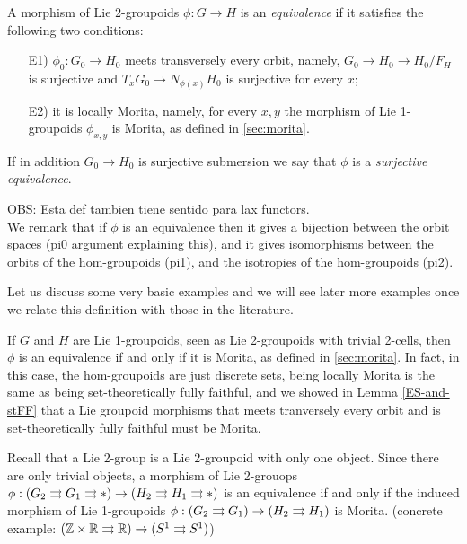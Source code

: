 \begin{mydef}
A morphism of Lie 2-groupoids $\phi: G\to H$ is an \emph{equivalence} if it satisfies the following two conditions:
\begin{enumerate}
\item[E1)] $\phi_0: G_0\to H_0$ meets transversely every orbit, namely, $G_0\to H_0\to H_0/F_H$ is surjective and $T_xG_0\to N_{\phi(x)}H_0$ is surjective for every $x$;
\item[E2)] it is locally Morita, namely, for every $x,y$ the morphism of Lie 1-groupoids $\phi_{x,y}$ is Morita, as defined in \textsection \ref{sec:morita}.
\end{enumerate}
If in addition $G_0\to H_0$ is surjective submersion we
say that $\phi$ is a \emph{surjective equivalence}.
\end{mydef}

\noi OBS: Esta def tambien tiene sentido para lax functors.\\

We remark that if $\phi$ is an equivalence then it gives a bijection between the orbit spaces (pi0 argument explaining this), and it gives isomorphisms between the orbits of the hom-groupoids (pi1), and the isotropies of the hom-groupoids (pi2).

Let us discuss some very basic examples and we will see later more examples once we relate this definition with those in the literature.

\begin{example}
If $G$ and $H$ are Lie 1-groupoids, seen as Lie 2-groupoids with trivial 2-cells, then $\phi$ is an equivalence if and only if it is Morita, as defined in \textsection \ref{sec:morita}.
In fact, in this case, the hom-groupoids are just discrete sets, being locally Morita is the same as being set-theoretically fully faithful, and we showed in Lemma \ref{ES-and-stFF} that a Lie groupoid morphisms that meets tranversely every orbit and is set-theoretically fully faithful must be Morita.
\end{example}

\begin{example}
Recall that a Lie 2-group is a Lie 2-groupoid with only one object.
Since there are only trivial objects, a morphism of Lie 2-grouops $\phi : (G_2\rightrightarrows G_1\rightrightarrows *) \to (H_2\rightrightarrows H_1\rightrightarrows *)$ is an equivalence if and only if the induced  morphism of Lie 1-groupoids $\phi : (G_2\rightrightarrows G_1) \to (H_2\rightrightarrows H_1)$ is Morita.
(concrete example: $(\mathbb Z\times\mathbb R\rightrightarrows\mathbb R)\to (S^1\rightrightarrows S^1)$)
\end{example}

